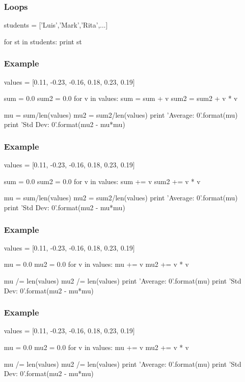 \begin{frame}[fragile]
\frametitle{Loops}

\begin{python}
students = ['Luis','Mark','Rita',...]

for st in students:
    print st
\end{python}
\end{frame}

\begin{frame}[fragile]
\frametitle{Example}

\begin{python}
values = [0.11, -0.23, -0.16, 0.18, 0.23, 0.19]

sum = 0.0
sum2 = 0.0
for v in values:
    sum = sum + v
    sum2 = sum2 + v * v

mu = sum/len(values)
mu2 = sum2/len(values)
print 'Average: {0}'.format(mu)
print 'Std Dev: {0}'.format(mu2 - mu*mu)
\end{python}
\end{frame}

\begin{frame}[fragile]
\frametitle{Example}

\begin{python}
values = [0.11, -0.23, -0.16, 0.18, 0.23, 0.19]

sum = 0.0
sum2 = 0.0
for v in values:
    sum += v
    sum2 += v * v

mu = sum/len(values)
mu2 = sum2/len(values)
print 'Average: {0}'.format(mu)
print 'Std Dev: {0}'.format(mu2 - mu*mu)
\end{python}
\end{frame}

\begin{frame}[fragile]
\frametitle{Example}

\begin{python}
values = [0.11, -0.23, -0.16, 0.18, 0.23, 0.19]

mu = 0.0
mu2 = 0.0
for v in values:
    mu += v
    mu2 += v * v

mu /= len(values)
mu2 /= len(values)
print 'Average: {0}'.format(mu)
print 'Std Dev: {0}'.format(mu2 - mu*mu)
\end{python}
\end{frame}

\begin{frame}[fragile]
\frametitle{Example}

\begin{python}
values = [0.11, -0.23, -0.16, 0.18, 0.23, 0.19]

mu = 0.0
mu2 = 0.0
for v in values:
    mu += v
    mu2 += v * v

mu /= len(values)
mu2 /= len(values)
print 'Average: {0}'.format(mu)
print 'Std Dev: {0}'.format(mu2 - mu*mu)
\end{python}
\end{frame}

